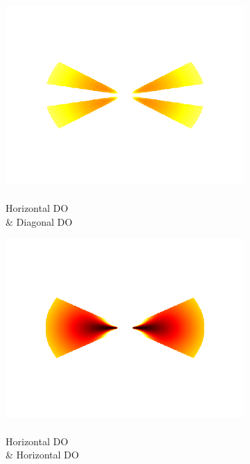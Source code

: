 \documentclass[journal,onecolumn]{IEEEtran}
\begin{document}
\begin{figure}[h]
\begin{subfigure}[b]{0.2\textwidth}
    \end{subfigure}%
    \begin{subfigure}[b]{0.2\textwidth}
            \centering
            \captionsetup{justification=centering}
            \includegraphics[width=.85\linewidth]{map-j_3_2}
            \caption{\\ Horizontal DO \\ \& Diagonal DO}
    \end{subfigure}%
    \begin{subfigure}[b]{0.2\textwidth}
            \centering
            \captionsetup{justification=centering}
            \includegraphics[width=.85\linewidth]{map-j_3_3}
            \caption{\\ Horizontal DO \\ \& Horizontal DO}
    \end{subfigure}
    \begin{subfigure}[b]{0.2\textwidth}
            \centering
            \captionsetup{justification=centering}

\end{subfigure}
\end{figure}
\end{document}
